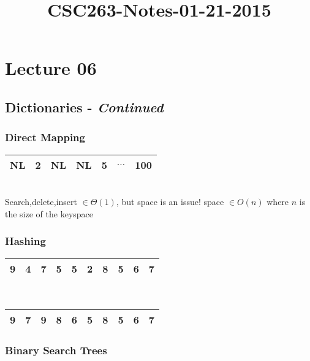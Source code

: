 



\title{CSC263-Notes-01-21-2015}



\section*{Lecture 06}

\subsection*{Dictionaries - \textit{Continued}}

\subsubsection*{Direct Mapping}

\noindent \begin{tabular}{| l | l | l | l | l | l | l |}
	\hline NL & 2 & NL & NL & 5 & $\ldots$ & 100 \\ \hline	
\end{tabular} \\
Search,delete,insert $\in \Theta(1)$, but space is an issue! space $\in O(n)$ where $n$ is the size of the keyspace

\subsubsection*{Hashing}

\begin{tabular}{| l | l | l | l | l | l | l | l | l | l |}
	\hline 9 & 4 & 7 & 5 & 5 & 2 & \textbf{8} & \textbf{5} & \textbf{6} & \textbf{7} \\ \hline
\end{tabular} \\

\noindent \begin{tabular}{| l | l | l | l | l | l | l | l | l | l |}
	\hline 9 & 7 & 9 & 8 & 6 & 5 & \textbf{8} & \textbf{5} & \textbf{6} & \textbf{7} \\ \hline
\end{tabular} 

\subsubsection*{Binary Search Trees}

